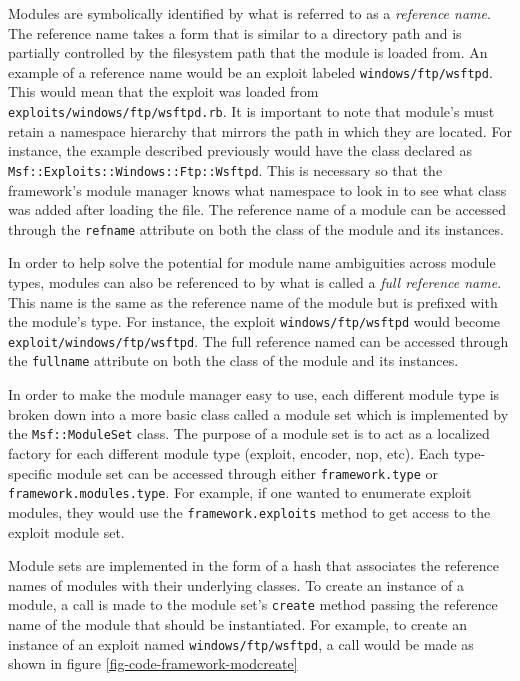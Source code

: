 \documentclass{report}
\begin{document}
\par
Modules are symbolically identified by what is referred to as a
\textit{reference name}.  The reference name takes a form that is
similar to a directory path and is partially controlled by the
filesystem path that the module is loaded from.  An example of a
reference name would be an exploit labeled
\texttt{windows/ftp/wsftpd}.  This would mean that the exploit was
loaded from \texttt{exploits/windows/ftp/wsftpd.rb}.  It is
important to note that module's must retain a namespace hierarchy
that mirrors the path in which they are located.  For instance, the
example described previously would have the class declared as
\texttt{Msf::Exploits::Windows::Ftp::Wsftpd}.  This is necessary so
that the framework's module manager knows what namespace to look in
to see what class was added after loading the file.  The reference
name of a module can be accessed through the \texttt{refname}
attribute on both the class of the module and its instances.

\par
In order to help solve the potential for module name ambiguities
across module types, modules can also be referenced to by what is
called a \textit{full reference name}.  This name is the same as the
reference name of the module but is prefixed with the module's type.
For instance, the exploit \texttt{windows/ftp/wsftpd} would become
\texttt{exploit/windows/ftp/wsftpd}.  The full reference named can
be accessed through the \texttt{fullname} attribute on both the
class of the module and its instances.

\par
In order to make the module manager easy to use, each different
module type is broken down into a more basic class called a module
set which is implemented by the \texttt{Msf::ModuleSet} class.  The
purpose of a module set is to act as a localized factory for each
different module type (exploit, encoder, nop, etc).  Each
type-specific module set can be accessed through either
\texttt{framework.type} or \texttt{framework.modules.type}.  For
example, if one wanted to enumerate exploit modules, they would use
the \texttt{framework.exploits} method to get access to the exploit
module set.

\par
Module sets are implemented in the form of a hash that associates
the reference names of modules with their underlying classes.  To
create an instance of a module, a call is made to the module set's
\texttt{create} method passing the reference name of the module that
should be instantiated.  For example, to create an instance of an
exploit named \texttt{windows/ftp/wsftpd}, a call would be made as
shown in figure \ref{fig-code-framework-modcreate}
\end{document}
